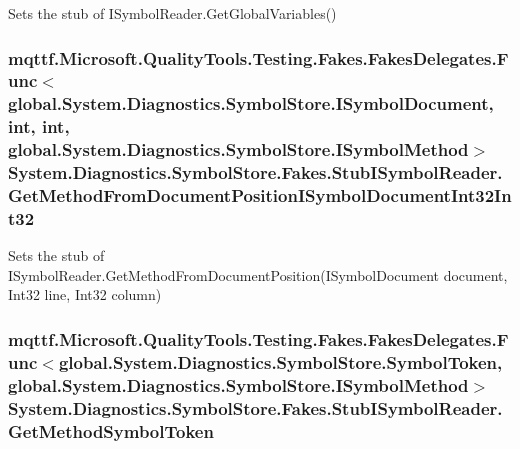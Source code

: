 Sets the stub of I\-Symbol\-Reader.\-Get\-Global\-Variables()

\hypertarget{class_system_1_1_diagnostics_1_1_symbol_store_1_1_fakes_1_1_stub_i_symbol_reader_aff833d7da62730091484ae360f1f0822}{
\subsubsection[{Get\-Method\-From\-Document\-Position\-I\-Symbol\-Document\-Int32\-Int32}]{\setlength{\rightskip}{0pt plus 5cm}mqttf.\-Microsoft.\-Quality\-Tools.\-Testing.\-Fakes.\-Fakes\-Delegates.\-Func$<$global.\-System.\-Diagnostics.\-Symbol\-Store.\-I\-Symbol\-Document, int, int, global.\-System.\-Diagnostics.\-Symbol\-Store.\-I\-Symbol\-Method$>$ System.\-Diagnostics.\-Symbol\-Store.\-Fakes.\-Stub\-I\-Symbol\-Reader.\-Get\-Method\-From\-Document\-Position\-I\-Symbol\-Document\-Int32\-Int32}}\label{class_system_1_1_diagnostics_1_1_symbol_store_1_1_fakes_1_1_stub_i_symbol_reader_aff833d7da62730091484ae360f1f0822}


Sets the stub of I\-Symbol\-Reader.\-Get\-Method\-From\-Document\-Position(\-I\-Symbol\-Document document, Int32 line, Int32 column)

\hypertarget{class_system_1_1_diagnostics_1_1_symbol_store_1_1_fakes_1_1_stub_i_symbol_reader_ac7852d5923b1f32470895b7ab650fe39}{
\subsubsection[{Get\-Method\-Symbol\-Token}]{\setlength{\rightskip}{0pt plus 5cm}mqttf.\-Microsoft.\-Quality\-Tools.\-Testing.\-Fakes.\-Fakes\-Delegates.\-Func$<$global.\-System.\-Diagnostics.\-Symbol\-Store.\-Symbol\-Token, global.\-System.\-Diagnostics.\-Symbol\-Store.\-I\-Symbol\-Method$>$ System.\-Diagnostics.\-Symbol\-Store.\-Fakes.\-Stub\-I\-Symbol\-Reader.\-Get\-Method\-Symbol\-Token}}\label{class_system_1_1_diagnostics_1_1_symbol_store_1_1_fakes_1_1_stub_i_symbol_reader_ac7852d5923b1f32470895b7ab650fe39}


